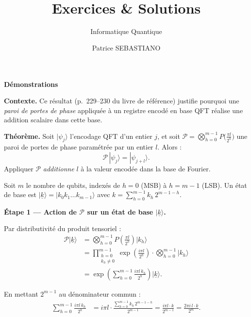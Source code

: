 \documentclass{ceri/sty/rapport}
\title{Exercices \& Solutions}
\subtitle{Informatique Quantique}
\author{
Patrice SEBASTIANO
}
\begin{document}
\let\origaddcontentsline\addcontentsline
\renewcommand{\addcontentsline}[3]{}
\maketitle
\let\addcontentsline\origaddcontentsline
\sloppy

{}
{\color{fgRed}\normalfont\Large\bfseries Démonstrations}
\par\vspace{2mm}
\begin{demonstration}

\textbf{Contexte.}
Ce résultat (p.~229--230 du livre de référence) justifie pourquoi une
\emph{paroi de portes de phase} appliquée à un registre encodé en base QFT
réalise une addition scalaire dans cette base.

\medskip
\textbf{Théorème.}
Soit $|\psi_j\rangle$ l'encodage QFT d'un entier $j$, et soit
$\mathcal{P} = \bigotimes_{h=0}^{m-1} P\!\bigl(\frac{\pi l}{2^h}\bigr)$
une paroi de portes de phase paramétrée par un entier $l$. Alors :
\[
  \mathcal{P}\,|\psi_j\rangle = |\psi_{j+l}\rangle.
\]
Appliquer $\mathcal{P}$ \emph{additionne} $l$ à la valeur encodée dans la
base de Fourier.

\bigskip

Soit $m$ le nombre de qubits, indexés de $h = 0$ (MSB) à $h = m-1$ (LSB).
Un état de base est $|\underline{k}\rangle = |k_0 k_1 \dots k_{m-1}\rangle$
avec $k = \sum_{h=0}^{m-1} k_h\, 2^{m-1-h}$.

\medskip
\noindent\textbf{Étape 1 — Action de $\mathcal{P}$ sur un état de base $|\underline{k}\rangle$.}

\smallskip
Par distributivité du produit tensoriel :
\begin{align*}
\mathcal{P}|\underline{k}\rangle
  &= \bigotimes_{h=0}^{m-1} P\!\left(\frac{\pi l}{2^h}\right) |k_h\rangle \\
  &= \prod_{\substack{h=0 \\ k_h \neq 0}}^{m-1}
       \exp\!\left(\frac{i\pi l}{2^h}\right)
       \cdot \bigotimes_{h=0}^{m-1} |k_h\rangle \\
  &= \exp\!\left(\sum_{h=0}^{m-1} \frac{i\pi l\, k_h}{2^h}\right) |\underline{k}\rangle.
\end{align*}

En mettant $2^{m-1}$ au dénominateur commun :
\begin{align*}
\sum_{h=0}^{m-1} \frac{i\pi l\, k_h}{2^h}
  &= i\pi l \cdot
     \frac{\displaystyle\sum_{h=0}^{m-1} k_h\, 2^{m-1-h}}{2^{m-1}}
   = \frac{i\pi l\cdot k}{2^{m-1}}
   = \frac{2\pi i\, l\cdot k}{2^m}.
\end{align*}


\end{demonstration}
\end{document}
